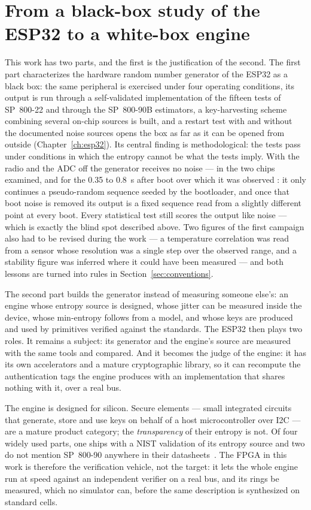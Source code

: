 \section{From a black-box study of the ESP32 to a white-box engine}
\label{sec:background}

This work has two parts, and the first is the justification of the
second. The first part characterizes the hardware random number generator
of the ESP32 as a black box: the same peripheral is exercised under four
operating conditions, its output is run through a self-validated
implementation of the fifteen tests of SP~800-22 and through the
SP~800-90B estimators, a key-harvesting scheme combining several on-chip
sources is built, and a restart test with and without the documented
noise sources opens the box as far as it can be opened from outside
(Chapter~\ref{ch:esp32}). Its central finding is methodological: the
tests pass under conditions in which the entropy cannot be what the tests
imply. With the radio and the ADC off the generator receives no noise
--- in the two chips examined, and for the 0.35 to 0.8~s after boot over
which it was observed \meas{}:
it only continues a pseudo-random sequence seeded by the bootloader, and
once that boot noise is removed its output is a fixed sequence read from
a slightly different point at every boot. Every statistical test still
scores the output like noise --- which is exactly the blind spot
described above.
Two figures of the first campaign also had to be revised during the work
--- a temperature correlation was read from a sensor whose resolution was
a single step over the observed range, and a stability figure was
inferred where it could have been measured --- and both lessons are
turned into rules in Section~\ref{sec:conventions}.

The second part builds the generator instead of measuring someone
else's: an engine whose entropy source is designed, whose jitter can be
measured inside the device, whose min-entropy follows from a model, and
whose keys are produced and used by primitives verified against the
standards. The ESP32 then plays two roles. It remains a subject: its
generator and the engine's source are measured with the same tools and
compared. And it becomes the judge of the engine: it has its own
accelerators and a mature cryptographic library, so it can recompute the
authentication tags the engine produces with an implementation that
shares nothing with it, over a real bus.

The engine is designed for silicon. Secure elements --- small integrated
circuits that generate, store and use keys on behalf of a host
microcontroller over I2C --- are a mature product category; the
\emph{transparency} of their entropy is not. Of four widely used parts,
one ships with a NIST validation of its entropy source and two do not
mention SP~800-90 anywhere in their datasheets~\cite{nist_esv_e46,
infineon_optiga_trustm_ds, st_stsafe_a110_ds}.
The FPGA in this work is therefore the verification vehicle, not the
target: it lets the whole engine run at speed against an independent
verifier on a real bus, and its rings be measured, which no simulator
can, before the same description is synthesized on standard cells.

